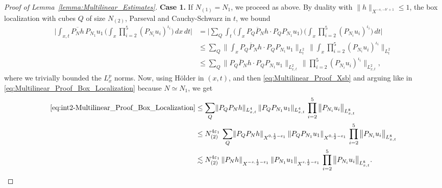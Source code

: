 \documentclass[10pt,a4paper]{amsart}
\begin{document}
\begin{proof}[Proof of Lemma~\ref{lemma:Multilinear_Estimates}]
\textbf{Case 1.} 
If $N_{(1)} = N_1$, we proceed as above. By duality with $\lVert h \rVert_{X^{-s, -b'+1}} \leq 1$, the box localization with cubes $Q$ of size $N_{(2)}$, 
Parseval and Cauchy-Schwarz in $t$, we bound
\begin{align}\label{eq:int2-Multilinear_Proof_Box_Localization}
    \Big| \int_{x,t} \overline{P_N h} \,  P_{N_1} u_1 \, \bigg(\int_x \prod_{i=2}^5 (P_{N_i} u_i)^{\iota_i} \bigg) \, dx\, dt \Big|
    & = \Big| \sum_{Q} \int_t \bigg( \int_x \overline{P_Q P_N h} \cdot  P_Q P_{N_1} u_1 \bigg) \,
    \bigg(\int_x \prod_{i=2}^5 (P_{N_i} u_i)^{\iota_i} \bigg) \, dt \Big| \nonumber
    \\
    & \leq \sum_{Q} 
    \bigg\lVert \int_x \overline{P_Q P_N h} \cdot P_Q P_{N_1} u_1\bigg\rVert_{L^2_t} 
    \, \Big\lVert \int_x \prod_{i=2}^5 (P_{N_i} u_i)^{\iota_i} \Big\rVert_{L^2_t} \nonumber \\
    & \leq 
    \sum_{Q} \big\lVert \overline{P_Q P_N h} \cdot P_Q P_{N_1} u_1 \big\rVert_{L^2_{x,t}} 
    \, \Big\lVert \prod_{i=2}^5 (P_{N_i} u_i)^{\iota_i} \Big\rVert_{L^2_{x,t}}, 
\end{align}
where we trivially bounded the $L^p_x$ norms. 
Now, using H\"older in $(x,t)$, and then \eqref{eq:Multilinear_Proof_Xsb} and arguing like in \eqref{eq:Multilinear_Proof_Box_Localization} because $N \simeq N_1$, we get 
\begin{align}
    \eqref{eq:int2-Multilinear_Proof_Box_Localization} & \leq 
    \sum_{Q} 
    \lVert P_Q P_N h  \rVert_{L^4_{x,t}} \, 
    \lVert  P_Q P_{N_1} u_1 \rVert_{L^4_{x,t}} 
    \, \prod_{i=2}^5 
    \big\lVert  P_{N_i} u_i \big\rVert_{L^8_{x,t}} \\
    & \leq 
    N_{(2)}^{4\varepsilon_1} \, \sum_{Q} 
    \lVert P_Q P_N h  \rVert_{X^{0,\frac{1}{2}-\varepsilon_1}} \, 
    \lVert  P_Q P_{N_1} u_1 \rVert_{X^{0,\frac{1}{2}-\varepsilon_1}} 
    \, \prod_{i=2}^5 
    \big\lVert  P_{N_i} u_i \big\rVert_{L^8_{x,t}} \\
    & \lesssim 
    N_{(2)}^{4\varepsilon_1}  \,
    \lVert  P_N h \rVert_{X^{-s, \frac{1}{2} - \varepsilon_1}} \, 
    \lVert  P_{N_1} u_1 \rVert_{X^{s, \frac{1}{2} - \varepsilon_1}} \, 
    \prod_{i=2}^5 
    \big\lVert  P_{N_i} u_i \big\rVert_{L^8_{x,t}}.
\end{align}




\end{proof}
\end{document}

